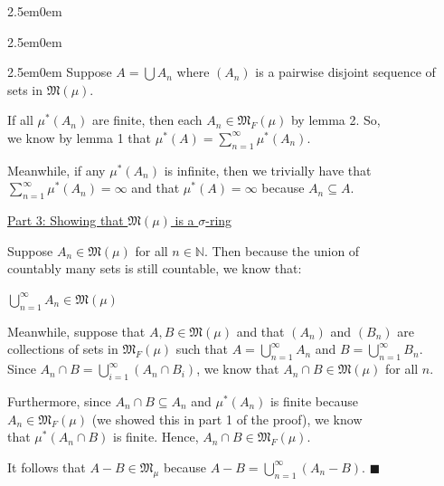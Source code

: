 \documentclass{book}
\newenvironment{myIndent}{%
   \begin{adjustwidth}{2.5em}{0em}%
}{%
   \end{adjustwidth}%
}
\newcommand{\retTwo}{\hfill\bigbreak}
\begin{document}
{\begin{myIndent}
{\begin{myIndent}
      {\begin{myIndent}\fontsize{12}{14}\selectfont
         Suppose $A = \bigcup A_n$ where $(A_n)$ is a pairwise disjoint sequence of\\ sets in $\mathfrak{M}(\mu)$.
         
         \newpage
         
         If all $\mu^*(A_n)$ are finite, then each $A_n \in \mathfrak{M}_F(\mu)$ by lemma 2. So,\\ we know by lemma 1 that $\mu^*(A) = \sum\limits_{n=1}^\infty \mu^*(A_n)$.\retTwo

         Meanwhile, if any $\mu^*(A_n)$ is infinite, then we trivially have that\\ $\sum\limits_{n=1}^\infty \mu^*(A_n) = \infty$ and that $\mu^*(A) = \infty$ because $A_n \subseteq A$.\\ [8pt]
      \end{myIndent}}

      {\centering \ul{Part 3: Showing that $\mathfrak{M}(\mu)$ is a $\sigma$-ring}\\[7pt]\par}

      Suppose $A_n \in \mathfrak{M}(\mu)$ for all $n \in \mathbb{N}$. Then because the union of\\ countably many sets is still countable, we know that:

      {\centering $\bigcup\limits_{n=1}^\infty A_n \in \mathfrak{M}(\mu)$ \retTwo\par}

      Meanwhile, suppose that $A, B \in \mathfrak{M}(\mu)$ and that $(A_n)$ and $(B_n)$ are\\ collections of sets in $\mathfrak{M}_F(\mu)$ such that $A = \bigcup\limits_{n=1}^\infty A_n$ and $B = \bigcup\limits_{n=1}^\infty B_n$.\\ [1pt]

      Since $A_n \cap B = \bigcup\limits_{i=1}^\infty (A_n \cap B_i)$, we  know that $A_n \cap B \in \mathfrak{M}(\mu)$ for all $n$.\retTwo
      
      Furthermore, since $A_n \cap B \subseteq A_n$ and $\mu^*(A_n)$ is finite because\\ $A_n \in \mathfrak{M}_F(\mu)$ (we showed this in part 1 of the proof), we know\\ that $\mu^*(A_n \cap B)$ is finite. Hence, $A_n \cap B \in \mathfrak{M}_F(\mu)$.\retTwo

      It follows that $A - B \in \mathfrak{M}_\mu$ because $A - B = \bigcup\limits_{n=1}^\infty(A_n - B)$. $\blacksquare$\retTwo
   \end{myIndent}}
\end{myIndent}}
\end{document}
